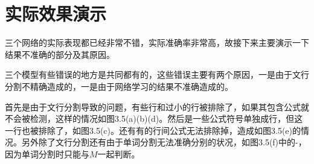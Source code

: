 \section{实际效果演示}
\noindent

三个网络的实际表现都已经非常不错，实际准确率非常高，故接下来主要演示一下结果不准确的部分及其原因。

三个模型有些错误的地方是共同都有的，这些错误主要有两个原因，一是由于文行分割不精确造成的，一是由于网络学习的结果不准确造成的。

首先是由于文行分割导致的问题，有些行和过小的行被排除了，如果其包含公式就不会被检测，这样的情况如图3.5(a)(b)(d)。然后是一些公式符号单独成行，但这一行也被排除了，如图3.5(c)。还有有的行间公式无法排除掉，造成如图3.5(e)的情况。另外除了文行分割还有由于单词分割无法准确分别的状况，如图3.5(f)中的-，因为单词分割时只能与$M$一起判断。
